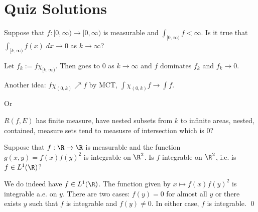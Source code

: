\newpage
\section{Quiz Solutions}


























\begin{quizsol}
Suppose that $f: [0,\infty) \to [0,\infty)$ is measurable and $\int_{[0,\infty)} f < \infty$. Is it true that $\int_{[k,\infty)} f(x) \; dx \to 0$ as $k \to \infty$? 
\end{quizsol}

\pf Let $f_k:= f \chi_{[k,\infty)}$. Then goes to $0$ as $k \to \infty$ and $f$ dominates $f_k$ and $f_k \to 0$. 


Another idea: $f \chi_{(0,k)} \nearrow f$ by MCT, $\int \chi_{(0,k)} f \to \int f$. 


Or 

$R(f,E)$ has finite measure, have nested subsets from $k$ to infinite areas, nested, contained, measure sets tend to measusre of intersection which is 0? 













\begin{quizsol}
Suppose that $f: \R \to \R$ is measurable and the function $g(x,y)= f(x)f(y)^2$ is integrable on $\R^2$. Is $f$ integrable on $\R^2$, i.e. is $f \in L^1(\R)$?
\end{quizsol}

\pf We do indeed have $f \in L^1(\R)$. The function given by $x \mapsto f(x)f(y)^2$ is integrable a.e. on $y$. There are two cases: $f(y)=0$ for almost all $y$ or there exists $y$ such that $f$ is integrable and $f(y) \neq 0$. In either case, $f$ is integrable. \qed \\






